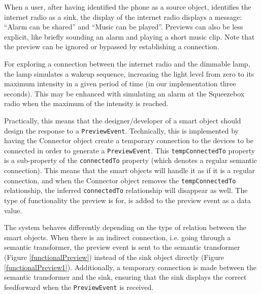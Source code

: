 \begin{example}
\label{phoneToSqueezebox}
When a user, after having identified the phone as a source object, identifies the internet radio as a sink, the display of the internet radio displays a message: ``Alarm can be shared'' and ``Music can be played''. Previews can also be less explicit, like briefly sounding an alarm and playing a short music clip. Note that the preview can be ignored or bypassed by establishing a connection.
\end{example}

\begin{example}
\label{squeezeboxToLamp}
For exploring a connection between the internet radio and the dimmable lamp, the lamp simulates a wakeup sequence, increasing the light level from zero to its maximum intensity in a given period of time (in our implementation three seconds). This may be enhanced with simulating an alarm at the Squeezebox radio when the maximum of the intensity is reached. 
\end{example}

Practically, this means that the designer/developer of a smart object should design the response to  a \texttt{PreviewEvent}. Technically, this is implemented by having the Connector object create a temporary connection to the devices to be connected in order to generate a \texttt{PreviewEvent}. This \texttt{tempConnectedTo} property is a sub-property of the \texttt{connectedTo} property (which denotes a regular semantic connection). This means that the smart objects will handle it as if it is a regular connection, and when the Connector object removes the \texttt{tempConnectedTo} relationship, the inferred \texttt{connectedTo} relationship will disappear as well. The type of functionality the preview is for, is added to the preview event as a data value.

The system behaves differently depending on the type of relation between the smart objects. When there is an indirect connection, i.e. going through a semantic transformer, the preview event is sent to the semantic transformer (Figure \ref{functionalPreview}) instead of the sink object directly (Figure \ref{functionalPreview1}). Additionally, a temporary connection is made between the semantic transformer and the sink, ensuring that the sink displays the correct feedforward when the \texttt{PreviewEvent} is received.


